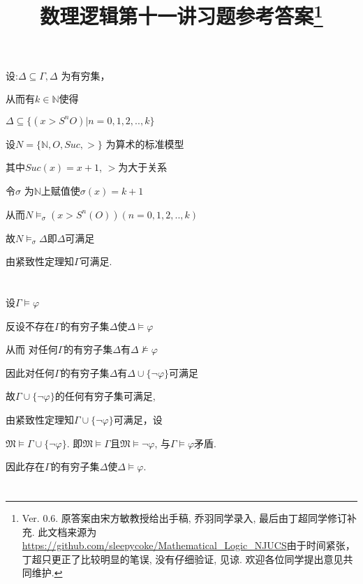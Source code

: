 \documentclass{article}
\begin{document}
\title{数理逻辑第十一讲习题参考答案\footnote{Ver. 0.6. 原答案由宋方敏教授给出手稿, 乔羽同学录入, 最后由丁超同学修订补充. 此文档来源为\url{https://github.com/sleepycoke/Mathematical_Logic_NJUCS}由于时间紧张，丁超只更正了比较明显的笔误, 没有仔细验证, 见谅. 
 欢迎各位同学提出意见共同维护. 
}}
\maketitle

\section{}

设:$\Delta \subseteq \Gamma, \Delta$ 为有穷集，

从而有$k \in \mathbb{N} $使得

$\Delta \subseteq \{ (x > S^nO) | n=0,1,2,..,k\}$

设$N = \{ \mathbb{N},O,Suc , >  \}$ 为算术的标准模型

其中$ Suc (x) =x+1 $, $ > $为大于关系

令$\sigma$ 为$\mathbb{N}$上赋值使$\sigma (x) = k+1$

从而$N \vDash_\sigma (x>S^n(O))(n=0,1,2,..,k)$

故$N \vDash_\sigma \Delta$即$\Delta$可满足

由紧致性定理知$\Gamma$可满足.

\section{}


设$\Gamma \vDash \varphi$

反设不存在$\Gamma$的有穷子集$\Delta$使$\Delta \vDash \varphi$

从而 对任何$\Gamma$的有穷子集$\Delta$有$\Delta \nvDash \varphi$

因此对任何$\Gamma$的有穷子集$\Delta$有$\Delta \cup \{\neg \varphi\}$可满足

故$\Gamma \cup \{\neg \varphi\}$的任何有穷子集可满足,

由紧致性定理知$\Gamma \cup \{\neg \varphi\}$可满足，设

$\mathfrak{M} \vDash \Gamma \cup\{\neg \varphi\}$. 即$\mathfrak{M} \vDash \Gamma$且$\mathfrak{M} \vDash \neg\varphi$, 与$\Gamma \models \varphi$矛盾. 

因此存在$\Gamma$的有穷子集$\Delta$使$\Delta \models \varphi$. 

\section{}
\end{document}
